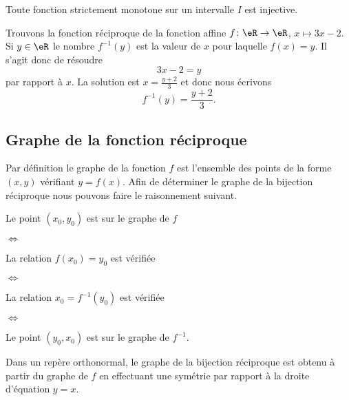 \begin{lemma}       \label{LEMooSDMMooYYDDLs}
  Toute fonction strictement monotone sur un intervalle $I$ est injective.
\end{lemma}

\begin{example}
    Trouvons la fonction réciproque de la fonction affine \( f\colon \eR\to \eR\), \( x\mapsto 3x-2\). Si \( y\in \eR\) le nombre \( f^{-1}(y)\) est la valeur de \( x\) pour laquelle \( f(x)=y\). Il s'agit donc de résoudre
    \begin{equation}
        3x-2=y
    \end{equation}
    par rapport à \( x\). La solution est \( x=\frac{ y+2 }{ 3 }\) et donc nous écrivons
    \begin{equation}
        f^{-1}(y)=\frac{ y+2 }{ 3 }.
    \end{equation}
\end{example}

\subsection{Graphe de la fonction réciproque}

Par définition le graphe de la fonction \( f\) est l'ensemble des points de la forme \( (x,y)\) vérifiant \( y=f(x)\). Afin de déterminer le graphe de la bijection réciproque nous pouvons faire le raisonnement suivant.

        Le point \( (x_0,y_0)\) est sur le graphe de \( f\)

\noindent\( \Leftrightarrow\)

        La relation \( f(x_0)=y_0\) est vérifiée

\noindent\( \Leftrightarrow\)

        La relation \( x_0=f^{-1}(y_0)\) est vérifiée

\noindent\( \Leftrightarrow\)

        Le point \( (y_0,x_0)\) est sur le graphe de \( f^{-1}\).

\begin{Aretenir}
    Dans un repère orthonormal, le graphe de la bijection réciproque est obtenu à partir du graphe de \( f\) en effectuant une symétrie par rapport à la droite d'équation \( y=x\).
\end{Aretenir}

